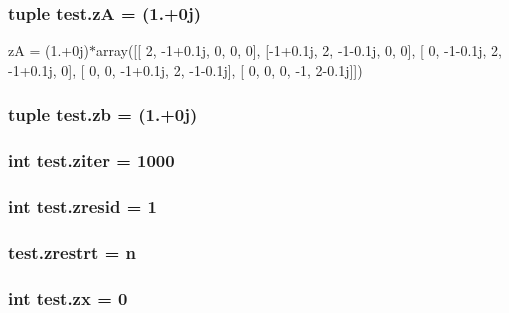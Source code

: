 \subsubsection[{z\+A}]{\setlength{\rightskip}{0pt plus 5cm}tuple test.\+z\+A = (1.+0j)}\label{namespacetest_a59b42baf65b733d63e04bf0b871e98cd}


z\+A = (1.+0j)$\ast$array(\mbox{[}\mbox{[} 2, -\/1+0.1j, 0, 0, 0\mbox{]}, \mbox{[}-\/1+0.1j, 2, -\/1-\/0.\+1j, 0, 0\mbox{]}, \mbox{[} 0, -\/1-\/0.\+1j, 2, -\/1+0.1j, 0\mbox{]}, \mbox{[} 0, 0, -\/1+0.1j, 2, -\/1-\/0.\+1j\mbox{]}, \mbox{[} 0, 0, 0, -\/1, 2-\/0.\+1j\mbox{]}\mbox{]}) 

\hypertarget{namespacetest_ae02a6e9ec4e5c8d8ec7f3421d3dc9e68}{}
\subsubsection[{zb}]{\setlength{\rightskip}{0pt plus 5cm}tuple test.\+zb = (1.+0j)}\label{namespacetest_ae02a6e9ec4e5c8d8ec7f3421d3dc9e68}
\hypertarget{namespacetest_ada01eb8317943098aafde6e4ad69bde7}{}
\subsubsection[{ziter}]{\setlength{\rightskip}{0pt plus 5cm}int test.\+ziter = 1000}\label{namespacetest_ada01eb8317943098aafde6e4ad69bde7}
\hypertarget{namespacetest_ac1f674a9fd2532e0f01b06945f02e25c}{}
\subsubsection[{zresid}]{\setlength{\rightskip}{0pt plus 5cm}int test.\+zresid = 1}\label{namespacetest_ac1f674a9fd2532e0f01b06945f02e25c}
\hypertarget{namespacetest_aecfe76bbc05b795146e283b4766d8051}{}
\subsubsection[{zrestrt}]{\setlength{\rightskip}{0pt plus 5cm}test.\+zrestrt = {\bf n}}\label{namespacetest_aecfe76bbc05b795146e283b4766d8051}
\hypertarget{namespacetest_aefba49a27ed9d351b74e202e6c246fa5}{}
\subsubsection[{zx}]{\setlength{\rightskip}{0pt plus 5cm}int test.\+zx = 0}\label{namespacetest_aefba49a27ed9d351b74e202e6c246fa5}
